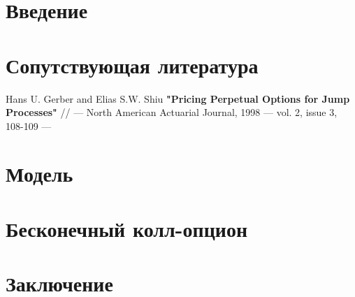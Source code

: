 \documentclass[a4paper,12pt]{article}
\begin{document}
\section{Введение}


\section{Сопутствующая литература}

\begin{thebibliography}{3}
Hans U. Gerber and Elias S.W. Shiu \textbf{"Pricing Perpetual Options for Jump Processes"} // --- North American Actuarial Journal, 1998 --- vol. 2, issue 3, 108-109 ---
\end{thebibliography}

\section{Модель}


\section{Бесконечный колл-опцион}


\section{Заключение}
\end{document}
